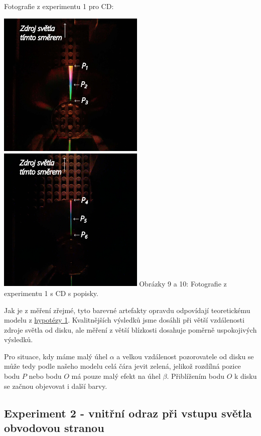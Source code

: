 \documentclass[titlepage]{article}
\begin{document}
Fotografie z experimentu 1 pro CD:

 \label{image:9}
 \label{image:10}
\begin{center}
    \includegraphics[height=7cm]{exp1_v_close.png}
    \includegraphics[height=7cm]{exp1_v_far.png}
    \linebreak
    Obrázky 9 a 10: Fotografie z experimentu 1 s CD s popisky.
\end{center}

Jak je z měření zřejmé, tyto barevné artefakty opravdu odpovídají teoretickému modelu z \hyperref[hyp:1]{hypotézy 1}. Kvalitnějších výsledků jsme dosáhli při větší vzdálenosti zdroje světla od disku, ale měření z větší blízkosti dosahuje poměrně uspokojivých výsledků.

Pro situace, kdy máme malý úhel $\alpha$ a velkou vzdálenost pozorovatele od disku se může tedy podle našeho modelu celá čára jevit zelená, jelikož rozdílná pozice bodu $P$ nebo bodu $O$ má pouze malý efekt na úhel $\beta$. Přiblížením bodu $O$ k disku se začnou objevovat i další barvy.

\label{exp:2}
\subsection{Experiment 2 - vnitřní odraz při vstupu světla obvodovou stranou}
\end{document}
